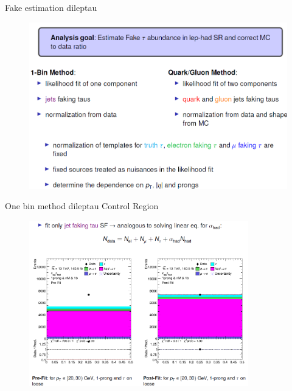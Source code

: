 \begin{frame}{Fake estimation dileptau}
    \begin{figure}
        \centering
        \includegraphics[width=\textwidth]{fake_strategy}
    \end{figure}
\end{frame}
 
\begin{frame}{One bin method dileptau Control Region}
    \begin{figure}
        \centering
        \includegraphics[width=0.85\textwidth]{oneBinCR}
    \end{figure}
\end{frame}

